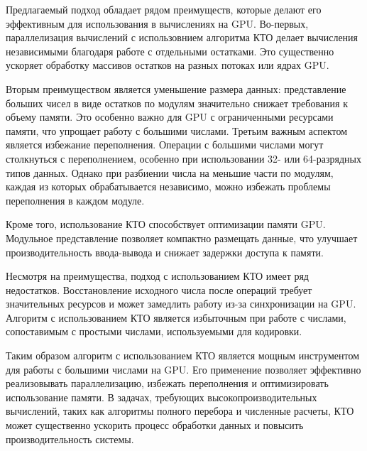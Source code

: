 \documentclass[10pt]{article}
\begin{document}
Предлагаемый подход обладает рядом преимуществ, которые делают его эффективным для использования в вычислениях на GPU. Во-первых, параллелизация вычислений с использовнием алгоритма КТО делает вычисления независимыми благодаря работе с отдельными остатками. Это существенно ускоряет обработку массивов остатков на разных потоках или ядрах GPU.

Вторым преимуществом является уменьшение размера данных: представление больших чисел в виде остатков по модулям значительно снижает требования к объему памяти. Это особенно важно для GPU с ограниченными ресурсами памяти, что упрощает работу с большими числами. Третьим важным аспектом является избежание переполнения. Операции с большими числами могут столкнуться с переполнением, особенно при использовании 32- или 64-разрядных типов данных. Однако при разбиении числа на меньшие части по модулям, каждая из которых обрабатывается независимо, можно избежать проблемы переполнения в каждом модуле.

Кроме того, использование КТО способствует оптимизации памяти GPU. Модульное представление позволяет компактно размещать данные, что улучшает производительность ввода-вывода и снижает задержки доступа к памяти.

Несмотря на преимущества, подход с использованием КТО имеет ряд недостатков. Восстановление исходного числа после операций требует значительных ресурсов и может замедлить работу из-за синхронизации на GPU. Алгоритм с использованием КТО является избыточным при работе с числами, сопоставимым с простыми числами, используемыми для кодировки.

Таким образом алгоритм с использованием КТО является мощным инструментом для работы с большими числами на GPU. Его применение позволяет эффективно реализовывать параллелизацию, избежать переполнения и оптимизировать использование памяти. В задачах, требующих высокопроизводительных вычислений, таких как алгоритмы полного перебора и численные расчеты, КТО может существенно ускорить процесс обработки данных и повысить производительность системы.
\end{document}
